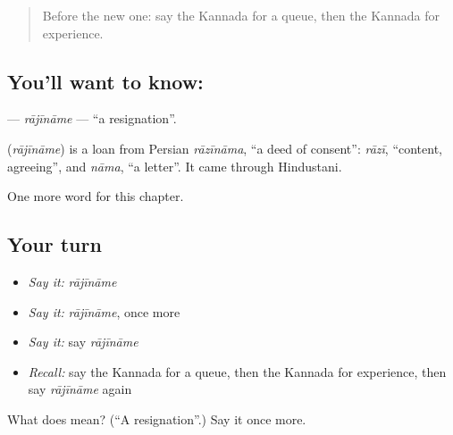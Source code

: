 \label{lesson:KA-C232-rajiname}



\begin{quote}
Before the new one: say the Kannada for a queue, then the Kannada for experience.
\end{quote}

\subsection*{You'll want to know: }
\textbf{} — \emph{rājīnāme} — \textquotedblleft{}a resignation\textquotedblright{}.

\begin{cousinweb}
\textbf{} (\emph{rājīnāme}) is a loan from Persian \emph{rāzīnāma}, \textquotedblleft{}a deed of consent\textquotedblright{}: \emph{rāzī}, \textquotedblleft{}content, agreeing\textquotedblright{}, and \emph{nāma}, \textquotedblleft{}a letter\textquotedblright{}. It came through Hindustani.
\end{cousinweb}

\begin{grammarlens}[title={What you've built}]
One more word for this chapter.
\end{grammarlens}

\subsection*{Your turn}
\begin{itemize}
\raggedright
  \item \emph{Say it:} \emph{rājīnāme}
  \item \emph{Say it:} \emph{rājīnāme}, once more
  \item \emph{Say it:} say \emph{rājīnāme}
  \item \emph{Recall:} say the Kannada for a queue, then the Kannada for experience, then say \emph{rājīnāme} again
\end{itemize}

\begin{tcolorbox}[breakable,colback=teal!4,colframe=teal!35!black,title={Before you move on}]
What does  mean? (\textquotedblleft{}A resignation\textquotedblright{}.) Say it once more.
\end{tcolorbox}
